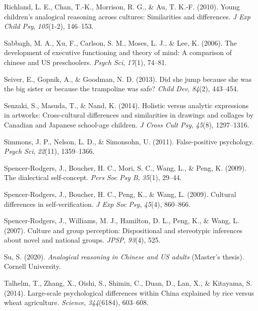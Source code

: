 \documentclass[
  man,floatsintext]{apa6}
\newlength{\cslhangindent}
\newlength{\cslentryspacingunit} %
\newenvironment{CSLReferences}[2] %
 {%
  \setlength{\parindent}{0pt}
  \ifodd #1
  \let\oldpar\par
  \def\par{\hangindent=\cslhangindent\oldpar}
  \fi
  \setlength{\parskip}{#2\cslentryspacingunit}
 }%
 {}
\begin{document}
\begin{CSLReferences}{1}{0}
\leavevmode{}%
Richland, L. E., Chan, T.-K., Morrison, R. G., \& Au, T. K.-F. (2010). Young children's analogical reasoning across cultures: Similarities and differences. \emph{J Exp Child Psy}, \emph{105}(1-2), 146--153.

\leavevmode{}%
Sabbagh, M. A., Xu, F., Carlson, S. M., Moses, L. J., \& Lee, K. (2006). The development of executive functioning and theory of mind: A comparison of chinese and US preschoolers. \emph{Psych Sci}, \emph{17}(1), 74--81.

\leavevmode{}%
Seiver, E., Gopnik, A., \& Goodman, N. D. (2013). Did she jump because she was the big sister or because the trampoline was safe? \emph{Child Dev}, \emph{84}(2), 443--454.

\leavevmode{}%
Senzaki, S., Masuda, T., \& Nand, K. (2014). Holistic versus analytic expressions in artworks: Cross-cultural differences and similarities in drawings and collages by {C}anadian and {J}apanese school-age children. \emph{J Cross Cult Psy}, \emph{45}(8), 1297--1316.

\leavevmode{}%
Simmons, J. P., Nelson, L. D., \& Simonsohn, U. (2011). False-positive psychology. \emph{Psych Sci}, \emph{22}(11), 1359--1366.

\leavevmode{}%
Spencer-Rodgers, J., Boucher, H. C., Mori, S. C., Wang, L., \& Peng, K. (2009). The dialectical self-concept. \emph{Pers Soc Psy B}, \emph{35}(1), 29--44.

\leavevmode{}%
Spencer-Rodgers, J., Boucher, H. C., Peng, K., \& Wang, L. (2009). Cultural differences in self-verification. \emph{J Exp Soc Psy}, \emph{45}(4), 860--866.

\leavevmode{}%
Spencer-Rodgers, J., Williams, M. J., Hamilton, D. L., Peng, K., \& Wang, L. (2007). Culture and group perception: Dispositional and stereotypic inferences about novel and national groups. \emph{JPSP}, \emph{93}(4), 525.

\leavevmode{}%
Su, S. (2020). \emph{Analogical reasoning in {C}hinese and {US} adults} (Master's thesis). Cornell University.

\leavevmode{}%
Talhelm, T., Zhang, X., Oishi, S., Shimin, C., Duan, D., Lan, X., \& Kitayama, S. (2014). Large-scale psychological differences within {C}hina explained by rice versus wheat agriculture. \emph{Science}, \emph{344}(6184), 603--608.


\end{CSLReferences}
\end{document}

